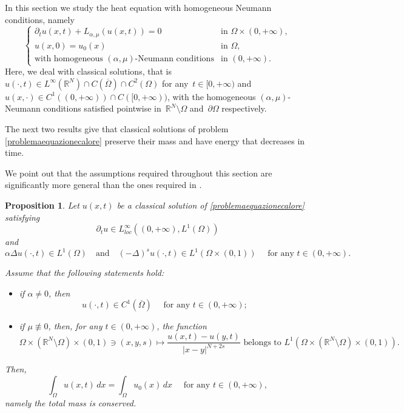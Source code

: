 \documentclass[12pt,a4paper,intlimits,sumlimits]{amsart}
\def \R {\mathbb{R}}
\theoremstyle{definition}
\theoremstyle{plain}
\newtheorem{proposition}[definition]{Proposition}
\numberwithin{equation}{section}
\begin{document}
In this section we study the heat equation with homogeneous
Neumann conditions, namely
\begin{equation}\label{problemaequazionecalore}
\begin{cases}
\partial_t u(x,t)+L_{\alpha,\mu}(u(x,t))=0  & \mbox{in }
\Omega\times (0,+\infty),
\\
u(x,0)= u_0(x)  & \mbox{in } \Omega,
\\
\mbox{with homogeneous }(\alpha,\mu)\mbox{-Neumann conditions}
& \mbox{in } (0,+\infty).
\end{cases}
\end{equation} 
Here, we deal with classical solutions, 
that is $u(\cdot,t)\in L^\infty(\R^N)\cap C(\overline{\Omega})\cap C^2(\Omega)$ for any~$t\in [0,+\infty)$ and~$u(x,\cdot)\in C^1((0,+\infty))\cap C([0,+\infty))$,
with the homogeneous $(\alpha,\mu)$-Neumann conditions satisfied 
pointwise in~$\R^N\setminus \Omega$ and~$\partial \Omega$ 
respectively.

The next two results give that classical solutions of problem
\eqref{problemaequazionecalore} preserve their mass and have 
energy that decreases in time. 

We point out that the assumptions required throughout this section are significantly more general than the ones required in \cite[Propositions 4.1, 4.2 and 4.3]{MR3651008}.

\begin{proposition}\label{proposizionemassacostante}
Let $u(x,t)$ be a classical solution of
\eqref{problemaequazionecalore} satisfying
\begin{equation}\label{ipotesimassa1}
\partial_t u \in L^\infty_{loc}\left((0,+\infty),L^1(\Omega)\right)
\end{equation}
and
\begin{equation}\label{ipotesimassa2}
\alpha\Delta u(\cdot,t)\in L^1(\Omega)\quad \mbox{and}\quad(-\Delta)^s u(\cdot,t)\in L^1\left(\Omega\times (0,1)\right)\quad\mbox{ for any } t\in (0,+\infty).
\end{equation}

Assume that the following statements hold:
\begin{itemize}
\item if $\alpha\neq 0$, then
\begin{equation}\label{ipotesimassa3}
u(\cdot,t)\in C^1(\overline{\Omega})\quad\mbox{ for any } t\in (0,+\infty);
\end{equation}
\item if $\mu \not \equiv 0$, then, for any $t\in (0,+\infty)$, the function
\begin{equation}\label{ipotesimassa4}
\Omega\times (\R^N \setminus \Omega)\times (0,1)\ni (x,y,s)\mapsto
\frac{u(x,t)-u(y,t)}{|x-y|^{N+2s}} \mbox{ belongs to }
L^1\left(\Omega\times (\R^N \setminus \Omega)\times (0,1)\right).
\end{equation}
\end{itemize}

Then, 
\[
\int_\Omega u(x,t)\,dx =\int_\Omega u_0(x)\,dx\quad\mbox{ for any } t\in (0,+\infty),
\]
namely the total mass is conserved.
\end{proposition}
\end{document}

